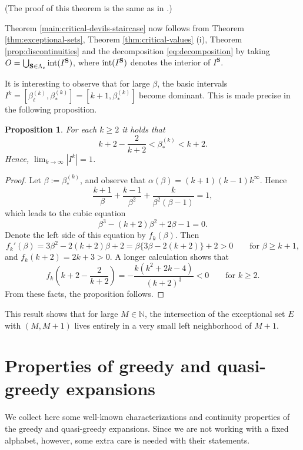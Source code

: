 \documentclass[12pt]{amsart}
\newtheorem{proposition}[theorem]{Proposition}
\theoremstyle{definition}
\theoremstyle{remark}
\numberwithin{equation}{section}
\newcommand{\N}{\ensuremath{\mathbb{N}}}
\newcommand{\cs}{ {\mathbf{S}}}
\newcommand{\f}{\infty}
\newcommand{\al}{\alpha}
\newcommand{\La}{\Lambda}
\begin{document}
{(The proof of this theorem is the same as in \cite{Allaart-Kong-2021}.)

Theorem \ref{main:critical-devils-staircase} now follows from Theorem \ref{thm:exceptional-sets}, Theorem \ref{thm:critical-values} (i), Theorem \ref{prop:discontinuities} and the decomposition \eqref{eq:decomposition} by taking $O=\bigcup_{\cs\in\La_e}{\rm int}(I^\cs)$, where ${\rm int} (I^\cs)$ denotes the interior of $I^{\cs}$.

It is interesting to observe that for large $\beta$, the basic intervals $I^k=[\beta_\ell^{(k)},\beta_*^{(k)}]=[k+1,\beta_*^{(k)}]$ become dominant. This is made precise in the following proposition.

\begin{proposition} \label{prop:dominant-intervals}
For each $k\geq 2$ it holds that
\[
k+2-\frac{2}{k+2}<\beta_*^{(k)}<k+2.
\]
Hence, $\lim_{k\to\f}|I^k|=1$.
\end{proposition}

\begin{proof}
Let $\beta:=\beta_*^{(k)}$, and observe that $\al(\beta)=(k+1)(k-1)k^\f$. Hence
\[
\frac{k+1}{\beta}+\frac{k-1}{\beta^2}+\frac{k}{\beta^2(\beta-1)}=1,
\]
which leads to the cubic equation
\[
\beta^3-(k+2)\beta^2+2\beta-1=0.
\]
Denote the left side of this equation by $f_k(\beta)$. Then
\[
f_k'(\beta)=3\beta^2-2(k+2)\beta+2=\beta\{3\beta-2(k+2)\}+2>0 \qquad\mbox{for $\beta\geq k+1$},
\]
and $f_k(k+2)=2k+3>0$. A longer calculation shows that
\[
f_k\left(k+2-\frac{2}{k+2}\right)=-\frac{k(k^2+2k-4)}{(k+2)^3}<0 \qquad \mbox{for $k\geq 2$}.
\]
From these facts, the proposition follows.
\end{proof}

This result shows that for large $M\in\N$, the intersection of the exceptional set $E$ with $(M,M+1)$ lives entirely in a very small left neighborhood of $M+1$.


\section{Properties of greedy and quasi-greedy expansions} \label{sec:greedy-and-quasi-greedy}

We collect here some well-known characterizations and continuity properties of the greedy and quasi-greedy expansions. Since we are not working with a fixed alphabet, however, some extra care is needed with their statements.

}
\end{document}
